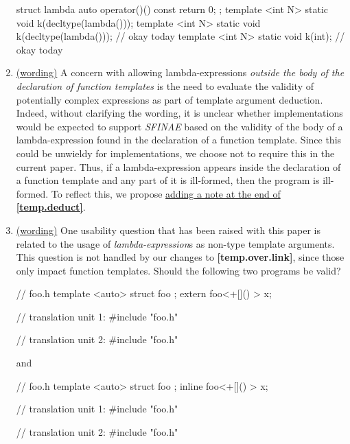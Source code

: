 \documentclass{wg21}
\begin{document}
\begin{enumerate}
\begin{cpp}
struct lambda { auto operator()() const { return 0; } };
template <int N> static void k(decltype(lambda{}()));
template <int N> static void k(decltype(lambda{}())); // okay today
template <int N> static void k(int);                  // okay today
\end{cpp}


  \item \label{discussion.sfinae}
    \hyperref[wording.sfinae]{(wording)}
    A concern with allowing lambda-expressions \textit{outside the body of
    the declaration of function templates} is the need to evaluate the validity
    of potentially complex expressions as part of template argument deduction.
    Indeed, without clarifying the wording, it is unclear whether implementations
    would be expected to support \textit{SFINAE} based on the validity of
    the body of a lambda-expression found in the declaration of a function
    template. Since this could be unwieldy for implementations, we choose not
    to require this in the current paper. Thus, if a lambda-expression appears
    inside the declaration of a function template and any part of it is ill-formed,
    then the program is ill-formed. To reflect this, we propose
    \hyperref[wording.sfinae]{adding a note at the end of \textbf{[temp.deduct]}}.


  \item \label{discussion.nontype}
    \hyperref[wording.nontype]{(wording)}
    One usability question that has been raised with this paper is related to
    the usage of \textit{lambda-expression}s as non-type template arguments.
    This question is not handled by our changes to \textbf{[temp.over.link]},
    since those only impact function templates. Should the following two
    programs be valid?

\begin{cpp}
// foo.h
template <auto> struct foo { };
extern foo<+[]() {}> x;

// translation unit 1:
#include "foo.h"

// translation unit 2:
#include "foo.h"
\end{cpp}

    and

\begin{cpp}
// foo.h
template <auto> struct foo { };
inline foo<+[]() {}> x;

// translation unit 1:
#include "foo.h"

// translation unit 2:
#include "foo.h"
\end{cpp}


\end{enumerate}
\end{document}
